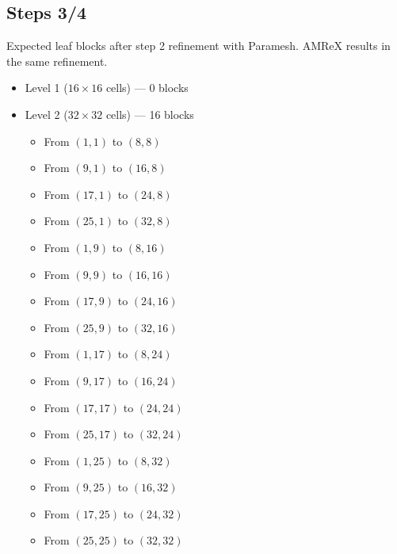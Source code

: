 \documentclass[12pt,letterpaper]{article}
\begin{document}
\subsection{Steps 3/4}
Expected leaf blocks after step 2 refinement with Paramesh.  AMReX results in
the same refinement.
\begin{itemize}
\item{Level 1 ($16 \times 16$ cells) --- 0 blocks}
\item{Level 2 ($32 \times 32$ cells) --- 16 blocks}
    \begin{itemize}
    \item{From $( 1, 1)$ to $( 8, 8)$}
    \item{From $( 9, 1)$ to $(16, 8)$}
    \item{From $(17, 1)$ to $(24, 8)$}
    \item{From $(25, 1)$ to $(32, 8)$}
    \item{From $( 1, 9)$ to $( 8,16)$}
    \item{From $( 9, 9)$ to $(16,16)$}
    \item{From $(17, 9)$ to $(24,16)$}
    \item{From $(25, 9)$ to $(32,16)$}
    \item{From $( 1,17)$ to $( 8,24)$}
    \item{From $( 9,17)$ to $(16,24)$}
    \item{From $(17,17)$ to $(24,24)$}
    \item{From $(25,17)$ to $(32,24)$}
    \item{From $( 1,25)$ to $( 8,32)$}
    \item{From $( 9,25)$ to $(16,32)$}
    \item{From $(17,25)$ to $(24,32)$}
    \item{From $(25,25)$ to $(32,32)$}
    \end{itemize}
\end{itemize}
\end{document}
